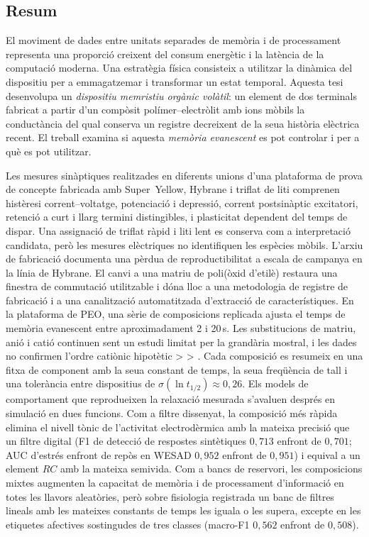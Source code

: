 \documentclass[12pt, twoside]{report}
\begin{document}
\begin{otherlanguage}{catalan}
\chapter*{Resum}

El moviment de dades entre unitats separades de memòria i de processament
representa una proporció creixent del consum energètic i la latència de la
computació moderna. Una estratègia física consisteix a utilitzar la dinàmica del
dispositiu per a emmagatzemar i transformar un estat temporal. Aquesta tesi
desenvolupa un \emph{dispositiu memristiu orgànic volàtil}: un element de dos
terminals fabricat a partir d'un compòsit polímer--electròlit amb ions mòbils la
conductància del qual conserva un registre decreixent de la seua història
elèctrica recent. El treball examina si aquesta \emph{memòria evanescent} es pot
controlar i per a què es pot utilitzar.

Les mesures sinàptiques realitzades en diferents unions d'una plataforma de prova
de concepte fabricada amb Super~Yellow, Hybrane i triflat de liti comprenen
histèresi corrent--voltatge, potenciació i depressió, corrent postsinàptic
excitatori, retenció a curt i llarg termini distingibles, i plasticitat dependent
del temps de dispar. Una assignació de triflat ràpid i liti lent es conserva com a
interpretació candidata, però les mesures elèctriques no identifiquen les
espècies mòbils. L'arxiu de fabricació documenta
una pèrdua de reproductibilitat a escala de campanya en la línia de Hybrane. El
canvi a una matriu de poli(òxid d'etilè) restaura una finestra de commutació
utilitzable i dóna lloc a una metodologia de registre de fabricació i a una
canalització automatitzada d'extracció de característiques. En la plataforma de
PEO, una sèrie de
composicions replicada ajusta el temps de memòria evanescent entre aproximadament
2 i 20\,s. Les substitucions de matriu, anió i catió continuen sent un estudi
limitat per la grandària mostral, i les dades no confirmen l'ordre catiònic
hipotètic  >  > . Cada composició es resumeix en una
fitxa de component amb la seua constant de temps, la seua freqüència de tall i una
tolerància entre dispositius de $\sigma(\ln t_{1/2})\approx0{,}26$. Els models de
comportament que reprodueixen la relaxació mesurada s'avaluen després en simulació
en dues funcions. Com a filtre dissenyat, la composició més ràpida elimina el
nivell tònic de l'activitat electrodèrmica amb la mateixa precisió que un filtre
digital (F1 de detecció de respostes sintètiques $0{,}713$ enfront de $0{,}701$;
AUC d'estrés enfront de repòs en WESAD $0{,}952$ enfront de $0{,}951$) i equival a
un element $RC$ amb la mateixa semivida. Com a bancs de reservori, les
composicions mixtes augmenten la capacitat de memòria i de processament
d'informació en totes les llavors aleatòries, però sobre fisiologia registrada un
banc de filtres lineals amb les mateixes constants de temps les iguala o les
supera, excepte en les etiquetes afectives sostingudes de tres classes (macro-F1
$0{,}562$ enfront de $0{,}508$).


\end{otherlanguage}
\end{document}
